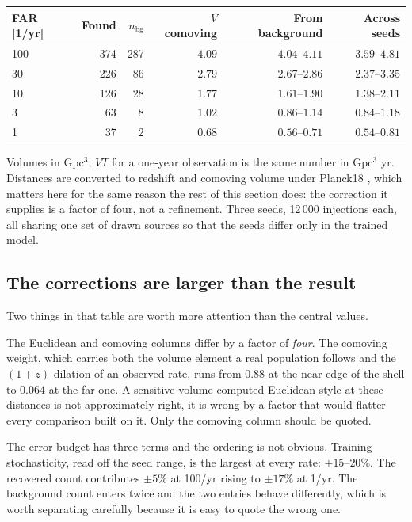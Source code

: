 \documentclass[11pt]{article}
\begin{document}
\begin{center}
\begin{tabular}{lrrrrr}
\toprule
FAR [1/yr] & Found & $n_\mathrm{bg}$ & $V$ comoving & From background & Across seeds \\
\midrule
100 & 374 & 287 & $\mathbf{4.09}$ & $4.04$--$4.11$ & $3.59$--$4.81$ \\
30  & 226 &  86 & $\mathbf{2.79}$ & $2.67$--$2.86$ & $2.37$--$3.35$ \\
10  & 126 &  28 & $\mathbf{1.77}$ & $1.61$--$1.90$ & $1.38$--$2.11$ \\
3   &  63 &   8 & $\mathbf{1.02}$ & $0.86$--$1.14$ & $0.84$--$1.18$ \\
1   &  37 &   2 & $\mathbf{0.68}$ & $0.56$--$0.71$ & $0.54$--$0.81$ \\
\bottomrule
\end{tabular}
\end{center}

Volumes in Gpc$^3$; $VT$ for a one-year observation is the same number in Gpc$^3$ yr.
Distances are converted to redshift and comoving volume under Planck18
\cite{Planck2018}, which matters here for the same reason the rest of this section does:
the correction it supplies is a factor of four, not a refinement.
Three seeds, 12\,000 injections each, all sharing one set of drawn sources so that the
seeds differ only in the trained model.

\subsection*{The corrections are larger than the result}

Two things in that table are worth more attention than the central values.

The Euclidean and comoving columns differ by a factor of \emph{four}. The comoving
weight, which carries both the volume element a real population follows and the $(1+z)$
dilation of an observed rate, runs from $0.88$ at the near edge of the shell to $0.064$
at the far one. A sensitive volume computed Euclidean-style at these distances is not
approximately right, it is wrong by a factor that would flatter every comparison built on
it. Only the comoving column should be quoted.

The error budget has three terms and the ordering is not obvious. Training
stochasticity, read off the seed range, is the largest at every rate: $\pm15$--$20\%$.
The recovered count contributes $\pm5\%$ at 100/yr rising to $\pm17\%$ at 1/yr. The
background count enters twice and the two entries behave differently, which is worth
separating carefully because it is easy to quote the wrong one.
\end{document}
